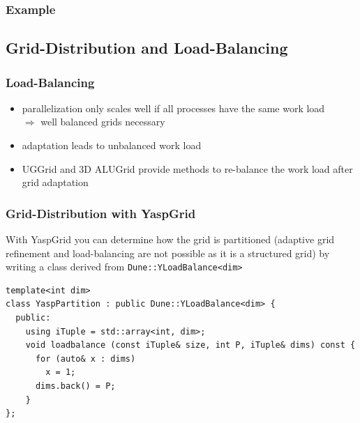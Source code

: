 \documentclass[aspectratio=169,11pt]{beamer}
\theoremstyle{definition}
\begin{document}
\begin{frame} \frametitle{Example}
  
\end{frame}

\subsection{Grid-Distribution and Load-Balancing}
\begin{frame}[fragile]
  \frametitle<presentation>{Load-Balancing}
  \begin{itemize}
  \item parallelization only scales well if all processes have the
    same work load\\
    $\Rightarrow$ well balanced grids necessary
  \item adaptation leads to unbalanced work load
  \item UGGrid and 3D ALUGrid provide methods to re-balance the work load after grid adaptation
  \end{itemize}
\end{frame}

\begin{frame}[fragile]
  \frametitle{Grid-Distribution with YaspGrid}
With YaspGrid you can determine how the grid is partitioned (adaptive grid refinement and load-balancing are not possible as it is a structured grid) by writing a class derived from
\lstinline!Dune::YLoadBalance<dim>!

\begin{lstlisting}[breaklines=true]
template<int dim>
class YaspPartition : public Dune::YLoadBalance<dim> {
  public:
    using iTuple = std::array<int, dim>;
    void loadbalance (const iTuple& size, int P, iTuple& dims) const {
      for (auto& x : dims)
        x = 1;
      dims.back() = P;
    }
};
\end{lstlisting}
\end{frame}
\end{document}
